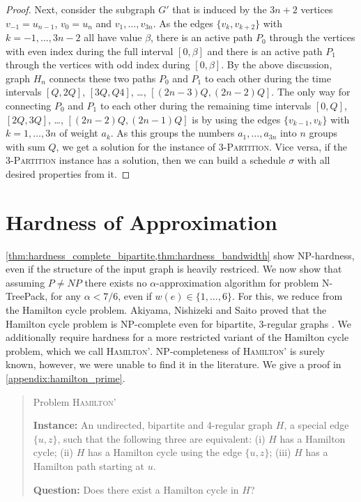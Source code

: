 \documentclass[runningheads]{llncs}
\newcommand{\set}[1]{\{ #1 \}}
\newcommand{\xxxNTP}{{\sc N-TreePack}}
\begin{document}
\begin{proof}
Next, consider the subgraph $G'$ that is induced by the $3n+2$ vertices $v_{-1}=u_{n-1}$, $v_0=u_n$ and 
$v_1,\ldots,v_{3n}$.
As the edges $\{v_k, v_{k+2}\}$ with $k=-1,\ldots,3n-2$ all have value $\beta$, there is an active path $P_0$ 
through the vertices with even index during the full interval $[0,\beta]$ and there is an active 
path $P_1$ through the vertices with odd index during $[0, \beta]$.
By the above discussion, graph $H_n$ connects these two paths $P_0$ and $P_1$ to each other during the
time intervals $[Q,2Q]$, $[3Q,Q4]$, \dots, $[(2n-3)Q,(2n-2)Q]$.
The only way for connecting $P_0$ and $P_1$ to each other during the remaining time intervals 
$[0,Q]$, $[2Q,3Q]$, \dots, $[(2n-2)Q,(2n-1)Q]$ is by using the edges $\{v_{k-1},v_k\}$ with $k=1,\ldots,3n$ of 
weight $a_k$.
As this groups the numbers $a_1,\ldots,a_{3n}$ into $n$ groups with sum $Q$, we get a solution
for the instance of \textsc{3-Partition}.
Vice versa, if the \textsc{3-Partition} instance has a solution, then we can build a schedule $\sigma$
with all desired properties from it.
\end{proof}

\section{Hardness of Approximation}
\label{sec:inapprox}

\cref{thm:hardness_complete_bipartite,thm:hardness_bandwidth} show NP-hardness, even if the structure of the input graph is heavily restriced. 
We now show that assuming $P \neq NP$ there exists no $\alpha$-approximation algorithm for problem {\xxxNTP}, for 
any $\alpha < 7/6$, even if $w(e) \in \{1,\dots,6\}$.
For this, we reduce from the Hamilton cycle problem. Akiyama, Nishizeki and Saito proved that the Hamilton cycle problem is NP-complete even for bipartite, 3-regular graphs \cite{hamilton3regularBip}. We additionally require hardness for a more restricted variant of the Hamilton cycle problem, which we call \textsc{Hamilton'}. NP-completeness of \textsc{Hamilton'} is surely known, however, we were unable to find it in the literature. We give a proof in \cref{appendix:hamilton_prime}.

\begin{quote}

Problem \textsc{Hamilton'} 

\textbf{Instance:} An undirected, bipartite and 4-regular graph $H$, a special edge $\set{u, z}$, such that the following three are equivalent: (i) $H$ has a Hamilton cycle; (ii) $H$ has a Hamilton cycle using the edge $\set{u, z}$; (iii) $H$ has a Hamilton path starting at $u$.

\textbf{Question:} Does there exist a Hamilton cycle in $H$?

\end{quote}
\end{document}
